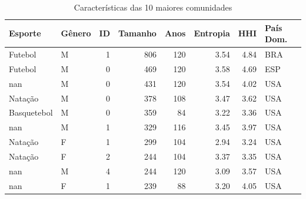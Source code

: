\begin{table}[htbp]
\caption{Características das 10 maiores comunidades}
\label{tab:top_communities}
\centering
\footnotesize
\begin{tabular}{llrrrrrl}
\toprule
\textbf{Esporte} & \textbf{Gênero} & \textbf{ID} & \textbf{Tamanho} & \textbf{Anos} & \textbf{Entropia} & \textbf{HHI} & \textbf{País Dom.} \\
\midrule
Futebol & M & 1 & 806 & 120 & 3.54 & 4.84 & BRA \\
Futebol & M & 0 & 469 & 120 & 3.58 & 4.69 & ESP \\
nan & M & 0 & 431 & 120 & 3.54 & 4.02 & USA \\
Natação & M & 0 & 378 & 108 & 3.47 & 3.62 & USA \\
Basquetebol & M & 0 & 359 & 84 & 3.22 & 3.36 & USA \\
nan & M & 1 & 329 & 116 & 3.45 & 3.97 & USA \\
Natação & F & 1 & 299 & 104 & 2.94 & 3.24 & USA \\
Natação & F & 2 & 244 & 104 & 3.37 & 3.35 & USA \\
nan & M & 4 & 244 & 120 & 3.09 & 3.57 & USA \\
nan & F & 1 & 239 & 88 & 3.20 & 4.05 & USA \\
\bottomrule
\end{tabular}
\end{table}
